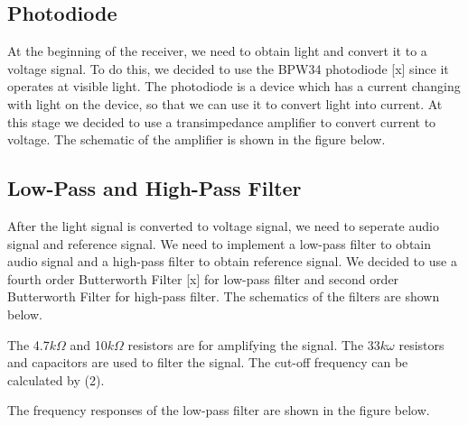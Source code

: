 \documentclass[conference]{IEEEtran}
\begin{document}
\subsection{Photodiode}
At the beginning of the receiver, we need to obtain light and convert it to a voltage signal. To do this, we decided to use the BPW34 photodiode [x] 
since it operates at visible light. The photodiode is a device which has a current changing with light on the device, so that we can use it 
to convert light into current. At this stage we decided to use a transimpedance amplifier to convert current to voltage. The schematic of the amplifier 
is shown in the figure below.


\subsection{Low-Pass and High-Pass Filter}
After the light signal is converted to voltage signal, we need to seperate audio signal and reference signal. We need to implement 
a low-pass filter to obtain audio signal and a high-pass filter to obtain reference signal. We decided to use a fourth order Butterworth 
Filter [x] for low-pass filter and second order Butterworth Filter for high-pass filter. The schematics of the filters are shown below. 


The 4.7\(k\Omega\) and 10\(k\Omega\) resistors are for amplifying the signal. The 33\(k\omega\) resistors and capacitors are used to filter the signal. 
The cut-off frequency can be calculated by (2).

The frequency responses of the low-pass filter are shown in the figure below. 
\end{document}

